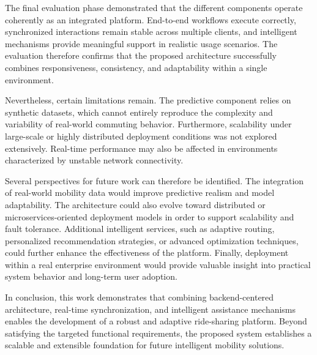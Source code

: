 The final evaluation phase demonstrated that the different components operate coherently as an integrated platform. End-to-end workflows execute correctly, synchronized interactions remain stable across multiple clients, and intelligent mechanisms provide meaningful support in realistic usage scenarios. The evaluation therefore confirms that the proposed architecture successfully combines responsiveness, consistency, and adaptability within a single environment.

Nevertheless, certain limitations remain. The predictive component relies on synthetic datasets, which cannot entirely reproduce the complexity and variability of real-world commuting behavior. Furthermore, scalability under large-scale or highly distributed deployment conditions was not explored extensively. Real-time performance may also be affected in environments characterized by unstable network connectivity.

Several perspectives for future work can therefore be identified. The integration of real-world mobility data would improve predictive realism and model adaptability. The architecture could also evolve toward distributed or microservices-oriented deployment models in order to support scalability and fault tolerance. Additional intelligent services, such as adaptive routing, personalized recommendation strategies, or advanced optimization techniques, could further enhance the effectiveness of the platform. Finally, deployment within a real enterprise environment would provide valuable insight into practical system behavior and long-term user adoption.

In conclusion, this work demonstrates that combining backend-centered architecture, real-time synchronization, and intelligent assistance mechanisms enables the development of a robust and adaptive ride-sharing platform. Beyond satisfying the targeted functional requirements, the proposed system establishes a scalable and extensible foundation for future intelligent mobility solutions.